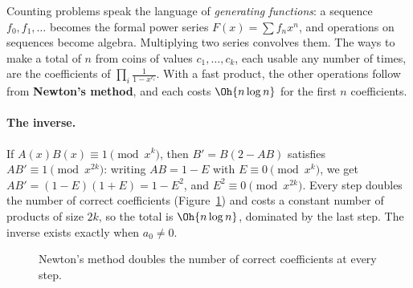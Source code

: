 Counting problems speak the language of \emph{generating functions}: a sequence $f_0, f_1, \dots$ becomes the formal power series $F(x) =
\sum f_n x^n$, and operations on sequences become algebra. Multiplying two series convolves them. The ways to make a total of $n$ from
coins of values $c_1, \dots, c_k$, each usable any number of times, are the coefficients of $\prod_i \frac{1}{1 - x^{c_i}}$. With a fast
product, the other operations follow from \textbf{Newton's method}, and each costs $\Oh{n \log n}$ for the first $n$ coefficients.

\paragraph{The inverse.} If $A(x) B(x) \equiv 1 \pmod{x^k}$, then $B' = B (2 - A B)$ satisfies $A B' \equiv 1 \pmod{x^{2k}}$: writing
$AB = 1 - E$ with $E \equiv 0 \pmod{x^k}$, we get $A B' = (1 - E)(1 + E) = 1 - E^2$, and $E^2 \equiv 0 \pmod{x^{2k}}$. Every step doubles
the number of correct coefficients (Figure~\ref{fig:newton}) and costs a constant number of products of size $2k$, so the total is
$\Oh{n \log n}$, dominated by the last step. The inverse exists exactly when $a_0 \ne 0$.

\begin{figure}[htbp]
\centering
{}
\caption{Newton's method doubles the number of correct coefficients at every step.}
\label{fig:newton}
\end{figure}

